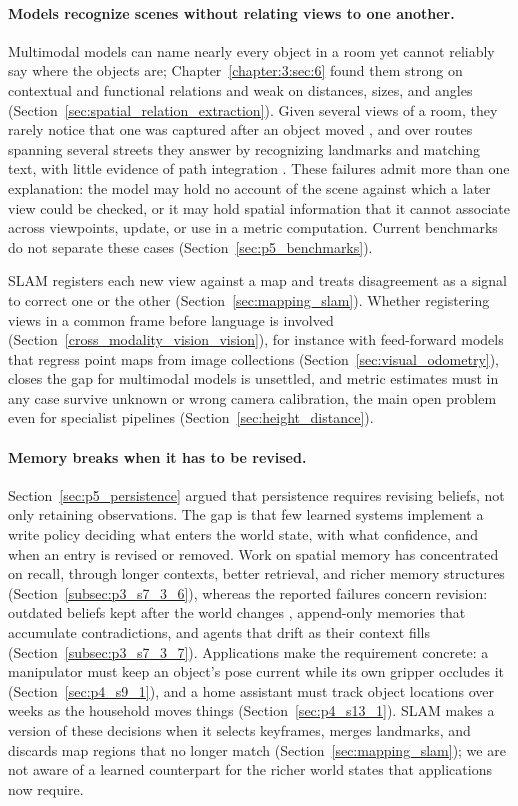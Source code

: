 \paragraph{Models recognize scenes without relating views to one another.}
Multimodal models can name nearly every object in a room yet cannot reliably say where the objects are; Chapter~\ref{chapter:3:sec:6} found them strong on contextual and functional relations and weak on distances, sizes, and angles (Section~\ref{sec:spatial_relation_extraction}).
Given several views of a room, they rarely notice that one was captured after an object moved \cite{cao2026samespace}, and over routes spanning several streets they answer by recognizing landmarks and matching text, with little evidence of path integration \cite{mahendran2026kilometervision}.
These failures admit more than one explanation: the model may hold no account of the scene against which a later view could be checked, or it may hold spatial information that it cannot associate across viewpoints, update, or use in a metric computation.
Current benchmarks do not separate these cases (Section~\ref{sec:p5_benchmarks}).

SLAM registers each new view against a map and treats disagreement as a signal to correct one or the other (Section~\ref{sec:mapping_slam}).
Whether registering views in a common frame before language is involved (Section~\ref{cross_modality_vision_vision}), for instance with feed-forward models that regress point maps from image collections (Section~\ref{sec:visual_odometry}), closes the gap for multimodal models is unsettled, and metric estimates must in any case survive unknown or wrong camera calibration, the main open problem even for specialist pipelines (Section~\ref{sec:height_distance}).

\paragraph{Memory breaks when it has to be revised.}
Section~\ref{sec:p5_persistence} argued that persistence requires revising beliefs, not only retaining observations.
The gap is that few learned systems implement a write policy deciding what enters the world state, with what confidence, and when an entry is revised or removed.
Work on spatial memory has concentrated on recall, through longer contexts, better retrieval, and richer memory structures (Section~\ref{subsec:p3_s7_3_6}), whereas the reported failures concern revision: outdated beliefs kept after the world changes \cite{zhang2026theory}, append-only memories that accumulate contradictions, and agents that drift as their context fills (Section~\ref{subsec:p3_s7_3_7}).
Applications make the requirement concrete: a manipulator must keep an object's pose current while its own gripper occludes it (Section~\ref{sec:p4_s9_1}), and a home assistant must track object locations over weeks as the household moves things (Section~\ref{sec:p4_s13_1}).
SLAM makes a version of these decisions when it selects keyframes, merges landmarks, and discards map regions that no longer match (Section~\ref{sec:mapping_slam}); we are not aware of a learned counterpart for the richer world states that applications now require.

